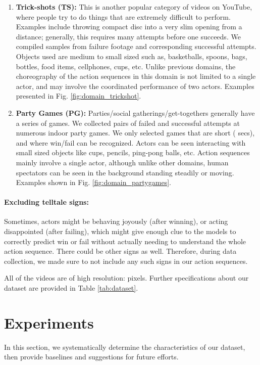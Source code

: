 \documentclass[final]{cvpr}
\begin{document}
\begin{enumerate}
\item{\textbf{Trick-shots (TS):}}
This is another popular category of videos on YouTube, where people try to do things that are extremely difficult to perform. Examples include throwing compact disc into a very slim opening from a distance; generally, this requires many attempts before one succeeds. We compiled samples from failure footage and corresponding successful attempts. Objects used are medium to small sized such as, basketballs, spoons, bags, bottles, food items, cellphones, cups, etc. Unlike previous domains, the choreography of the action sequences in this domain is not limited to a single actor, and may involve the coordinated performance of two actors. Examples presented in Fig. \ref{fig:domain_trickshot}.

\item{\textbf{Party Games (PG):}}
Parties/social gatherings/get-togethers generally have a series of games. 
We collected pairs of failed and successful attempts at numerous indoor party games. We only selected games that are short ( secs), and where win/fail can be recognized. Actors can be seen interacting with small sized objects like cups, pencils, ping-pong balls, etc. Action sequences mainly involve a single actor, although unlike other domains, human spectators can be seen in the background standing steadily or moving. Examples shown in Fig. \ref{fig:domain_partygames}.
\end{enumerate}

\paragraph{Excluding telltale signs:} Sometimes, actors might be behaving joyously (after winning), or acting disappointed (after failing), which might give enough clue to the models to correctly predict win or fail without actually needing to understand the whole action sequence. There could be other signs as well. Therefore, during data collection, we made sure to not include any such signs in our action sequences.

All of the videos are of high resolution:  pixels. Further specifications about our dataset are provided in Table \ref{tab:dataset}. \section{Experiments}
\label{sec:exp}
In this section, we systematically determine the characteristics of our dataset, then provide baselines and suggestions for future efforts. 
\end{document}
